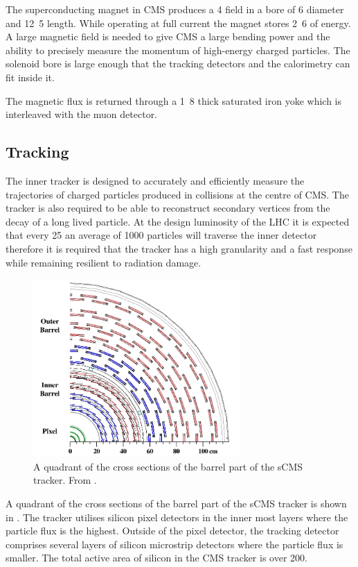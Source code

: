 The superconducting magnet in CMS produces a \unit{4}{\tesla} field in a bore of
\unit{6}{\meter} diameter and \unit{12.5}{\meter} length.  While operating at
full current the magnet stores \unit{2.6}{\giga\joule} of energy.  A large
magnetic field is needed to give CMS a large bending power and the ability to
precisely measure the momentum of high-energy charged particles.  The solenoid
bore is large enough that the tracking detectors and the calorimetry can fit
inside it.\cite{cms}

The magnetic flux is returned through a \unit{1.8}{\meter} thick saturated iron
yoke which is interleaved with the muon detector.

\subsection{Tracking}
The inner tracker is designed to accurately and efficiently measure the
trajectories of charged particles produced in collisions at the centre of CMS.
The tracker is also required to be able to reconstruct secondary vertices from
the decay of a long lived particle.  At the design luminosity of the LHC it
is expected that every \unit{25}{\ns} an average of 1000 particles will traverse
the inner detector therefore it is required that the tracker has a high
granularity and a fast response while remaining resilient to radiation damage. 

\begin{figure}[htbp]
  \centering
  \includegraphics[width=0.7\textwidth]{tracker}
  \caption{A quadrant of the cross sections of the barrel part of the s{CMS}
tracker. From \cite{adam}.}
  \label{fig:tracker}
\end{figure}

A quadrant of the cross sections of the barrel part of the s{CMS}
tracker is shown in .
The tracker utilises silicon pixel detectors in the inner most layers where the
particle flux is the highest.  Outside of the pixel detector, the tracking
detector comprises several layers of silicon microstrip detectors where the
particle flux is smaller.  The total active area of silicon in the CMS tracker
is over \unit{200}{\meter\squared}.\cite{cms}

